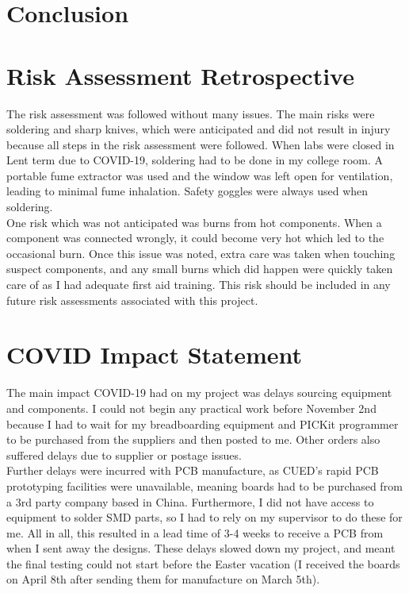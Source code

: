 \documentclass{IIBproject}
\begin{document}




\section{Conclusion}





\newpage




\newpage
\appendix
\appendixpage
\addappheadtotoc

\section{Risk Assessment Retrospective}
The risk assessment was followed without many issues. The main risks were soldering and sharp knives, which were anticipated and did not result in injury because all steps in the risk assessment were followed. When labs were closed in Lent term due to COVID-19, soldering had to be done in my college room. A portable fume extractor was used and the window was left open for ventilation, leading to minimal fume inhalation. Safety goggles were always used when soldering.\\

One risk which was not anticipated was burns from hot components. When a component was connected wrongly, it could become very hot which led to the occasional burn. Once this issue was noted, extra care was taken when touching suspect components, and any small burns which did happen were quickly taken care of as I had adequate first aid training. This risk should be included in any future risk assessments associated with this project.\\


\newpage
\section{COVID Impact Statement}
The main impact COVID-19 had on my project was delays sourcing equipment and components. I could not begin any practical work before November 2nd because I had to wait for my breadboarding equipment and PICKit programmer to be purchased from the suppliers and then posted to me. Other orders also suffered delays due to supplier or postage issues.\\

Further delays were incurred with PCB manufacture, as CUED's rapid PCB prototyping facilities were unavailable, meaning boards had to be purchased from a 3rd party company based in China. Furthermore, I did not have access to equipment to solder SMD parts, so I had to rely on my supervisor to do these for me. All in all, this resulted in a lead time of 3-4 weeks to receive a PCB from when I sent away the designs. These delays slowed down my project, and meant the final testing could not start before the Easter vacation (I received the boards on April 8th after sending them for manufacture on March 5th).\\
\end{document}
